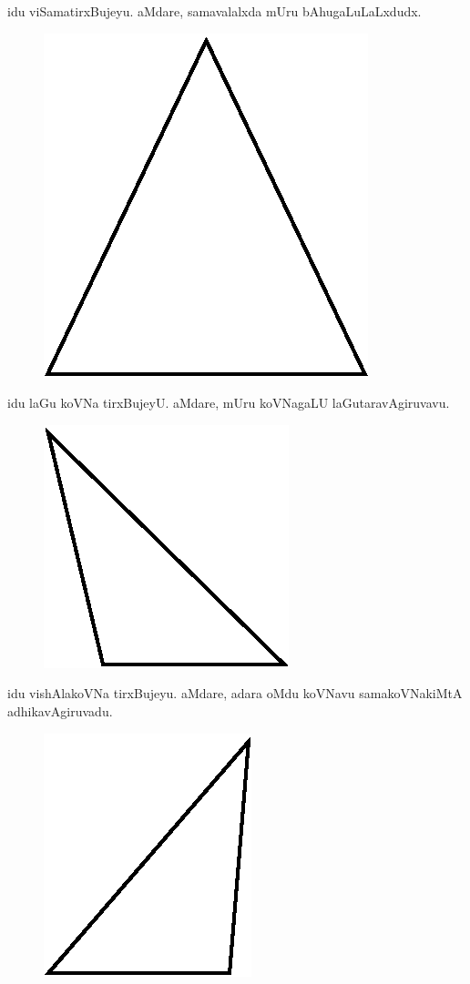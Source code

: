 idu viSamatirxBujeyu. aMdare, samavalalxda mUru bAhugaLuLaLxdudx.
\begin{figure}[H]
\centering
\includegraphics[scale=.65]{figure/fig4.eps}
\end{figure}
idu laGu koVNa tirxBujeyU. aMdare, mUru koVNagaLU laGutaravAgiruvavu.
\begin{figure}[H]
\centering
\includegraphics[scale=.75]{figure/fig5.eps}
\end{figure}
idu vishAlakoVNa tirxBujeyu. aMdare, adara oMdu koVNavu samakoVNakiMtA
adhikavAgiruvadu.
\begin{figure}[H]
\centering
\includegraphics[scale=.7]{figure/fig6.eps}
\end{figure}
